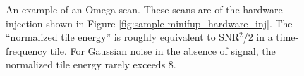 \begin{figure}[p]
\center
{}
\label{fig:sample-omega_hardware_inj}
\caption{An example of an Omega scan. These scans are of the hardware injection shown in Figure \ref{fig:sample-minifup_hardware_inj}. The ``normalized tile energy'' is roughly equivalent to SNR$^2$/2 in a time-frequency tile. For Gaussian noise in the absence of signal, the normalized tile energy rarely exceeds 8. }
\end{figure}

